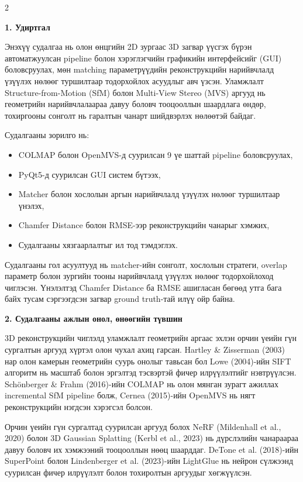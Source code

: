 \begin{multicols}{2}
\setlength{\parskip}{5pt}
\sloppy

\noindent\textbf{1. Удиртгал}

Энэхүү судалгаа нь олон өнцгийн 2D зургаас 3D загвар үүсгэх бүрэн автоматжуулсан pipeline болон хэрэглэгчийн графикийн интерфейсийг (GUI) боловсруулах, мөн matching параметрүүдийн реконструкцийн нарийвчлалд үзүүлэх нөлөөг туршилтаар тодорхойлох асуудлыг авч үзсэн. Уламжлалт Structure-from-Motion (SfM) болон Multi-View Stereo (MVS) аргууд нь геометрийн нарийвчлалаараа давуу боловч тооцооллын шаардлага өндөр, тохиргооны сонголт нь гаралтын чанарт шийдвэрлэх нөлөөтэй байдаг.

Судалгааны зорилго нь:
\begin{itemize}
    \item COLMAP болон OpenMVS-д суурилсан 9 үе шаттай pipeline боловсруулах,
    \item PyQt5-д суурилсан GUI систем бүтээх,
    \item Matcher болон хослолын аргын нарийвчлалд үзүүлэх нөлөөг туршилтаар үнэлэх,
    \item Chamfer Distance болон RMSE-ээр реконструкцийн чанарыг хэмжих,
    \item Судалгааны хязгаарлалтыг ил тод тэмдэглэх.
\end{itemize}

Судалгааны гол асуултууд нь matcher-ийн сонголт, хослолын стратеги, overlap параметр болон зургийн тооны нарийвчлалд үзүүлэх нөлөөг тодорхойлоход чиглэсэн. Үнэлэлтэд Chamfer Distance ба RMSE ашигласан бөгөөд утга бага байх тусам сэргээгдсэн загвар ground truth-тай илүү ойр байна.

\noindent\textbf{2. Судалгааны ажлын онол, өнөөгийн түвшин}

3D реконструкцийн чиглэлд уламжлалт геометрийн аргаас эхлэн орчин үеийн гүн сургалтын аргууд хүртэл олон чухал ахиц гарсан. Hartley \& Zisserman (2003) нар олон камерын геометрийн суурь онолыг тавьсан бол Lowe (2004)-ийн SIFT алгоритм нь масштаб болон эргэлтэд тэсвэртэй фичер илрүүлэлтийг нэвтрүүлсэн. Sch{\"o}nberger \& Frahm (2016)-ийн COLMAP нь олон мянган зурагт ажиллах incremental SfM pipeline болж, Cernea (2015)-ийн OpenMVS нь нягт реконструкцийн нэгдсэн хэрэгсэл болсон.

Орчин үеийн гүн сургалтад суурилсан аргууд болох NeRF (Mildenhall et al., 2020) болон 3D Gaussian Splatting (Kerbl et al., 2023) нь дүрслэлийн чанараараа давуу боловч их хэмжээний тооцооллын нөөц шаарддаг. DeTone et al. (2018)-ийн SuperPoint болон Lindenberger et al. (2023)-ийн LightGlue нь нейрон сүлжээнд суурилсан фичер илрүүлэлт болон тохиролтын аргуудыг хөгжүүлсэн.


\end{multicols}
